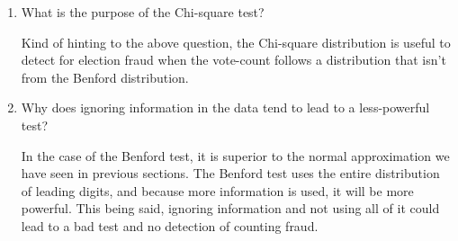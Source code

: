 \begin{enumerate}
 \item What is the purpose of the Chi-square test?
\begin{solution}
Kind of hinting to the above question, the Chi-square distribution is useful to detect for election fraud when the vote-count follows a distribution that isn't from the Benford distribution. 
\end{solution}

 \item Why does ignoring information in the data tend to lead to a less-powerful test?
\begin{solution}
In the case of the Benford test, it is superior to the normal approximation we have seen in previous sections. The Benford test uses the entire distribution of leading digits, and because more information is used, it will be more powerful. This being said, ignoring information and not using all of it could lead to a bad test and no detection of counting fraud. 
\end{solution}

\end{enumerate}




